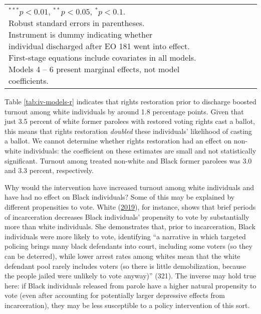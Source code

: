 \documentclass[
  12pt,
]{article}
\begin{document}
\begin{singlespace}
\begin{table}[H]
\begin{tabular}{lcccccc}
\hline
\multicolumn{3}{l}{\scriptsize{\parbox{.5\linewidth}{\vspace{2pt}$^{***}p<0.01$, $^{**}p<0.05$, $^*p<0.1$. \\
Robust standard errors in parentheses. \\
Instrument is dummy indicating whether \\
individual discharged after EO 181 went into effect. \\
First-stage equations include covariates in all models. \\
Models 4 -- 6 present marginal effects, not model coefficients.}}}
\end{tabular}
\end{table}

\end{singlespace}

Table \ref{tab:iv-models-r} indicates that rights restoration prior to discharge boosted turnout among white individuals by around 1.8 percentage points. Given that just 3.5 percent of white former parolees with restored voting rights cast a ballot, this means that rights restoration \emph{doubled} these individuals' likelihood of casting a ballot. We cannot determine whether rights restoration had an effect on non-white individuals: the coefficient on these estimates are small and not statistically significant. Turnout among treated non-white and Black former parolees was 3.0 and 3.3 percent, respectively.

Why would the intervention have increased turnout among white individuals and have had no effect on Black individuals? Some of this may be explained by different propensities to vote. White (\protect\hyperlink{ref-White2019}{2019}), for instance, shows that brief periods of incarceration decreases Black individuals' propensity to vote by substantially more than white individuals. She demonstrates that, prior to incarceration, Black individuals were more likely to vote, identifying ``a narrative in which targeted policing brings many black defendants into court, including some voters (so they can be deterred), while lower arrest rates among whites mean that the white defendant pool rarely includes voters (so there is little demobilization, because the people jailed were unlikely to vote anyway)'' (321). The inverse may hold true here: if Black individuals released from parole have a higher natural propensity to vote (even after accounting for potentially larger depressive effects from incarceration), they may be less susceptible to a policy intervention of this sort.
\end{document}
